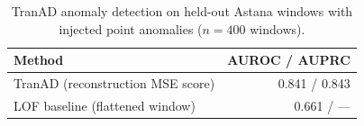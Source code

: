 \begin{table}[H]
  \centering
  \caption{TranAD anomaly detection on held-out Astana windows with injected point anomalies ($n=400$ windows).}
  \label{tab:tranad-auroc}
  \begin{tabular}{@{}lr@{}}
    \toprule
    Method & AUROC / AUPRC \\
    \midrule
    TranAD (reconstruction MSE score) & 0.841 / 0.843 \\
    LOF baseline (flattened window) & 0.661 / --- \\
    \bottomrule
  \end{tabular}
\end{table}
